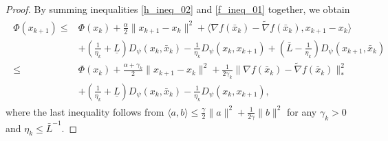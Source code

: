 \documentclass[letterpaper]{article} %
\begin{document}
\begin{proof}
		By summing inequalities \eqref{h_ineq_02} and \eqref{f_ineq_01} together, we obtain
		\begin{eqnarray}
			\begin{aligned}
				\Phi(x_{k+1})\le &\Phi(x_{k}) +\frac{\alpha}{2}\|x_{k+1}-x_{k}\|^{2}+\langle \nabla f(\bar{x}_{k})-\tilde{\nabla} f(\bar{x}_{k}), x_{k+1}-x_{k}\rangle\\
				&+\left(\frac{1}{\eta_{k}}+\underline{L}\right)D_{\psi}(x_{k},\bar{x}_{k}) -\frac{1}{\eta_{k}}D_{\psi}(x_{k},x_{k+1})+\left(\bar{L}-\frac{1}{\eta_{k}}\right)D_{\psi}(x_{k+1},\bar{x}_{k})\\
				\le&\Phi(x_{k}) +\frac{\alpha+\gamma_{k}}{2}\|x_{k+1}-x_{k}\|^{2}+\frac{1}{2\gamma_{k}}\|\nabla f(\bar{x}_{k})-\tilde{\nabla} f(\bar{x}_{k})\|_{*}^{2}\\
				&+\left(\frac{1}{\eta_{k}}+\underline{L}\right)D_{\psi}(x_{k},\bar{x}_{k}) -\frac{1}{\eta_{k}}D_{\psi}(x_{k},x_{k+1}),
			\end{aligned}
		\end{eqnarray}
		where the last inequality follows from $\langle a,b\rangle \le \frac{\gamma}{2}\|a\|^{2}+\frac{1}{2\gamma}\|b\|^{2}$ for any $\gamma_k>0$ and $\eta_{k}\le \bar{L}^{-1}$.


\end{proof}
\end{document}
